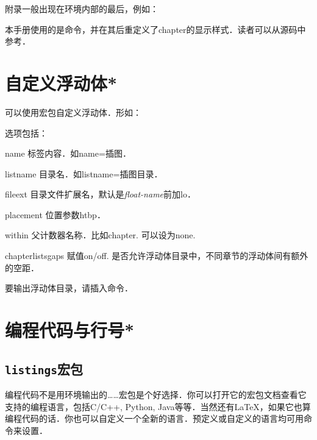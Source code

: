 附录一般出现在环境内部的最后，例如：
\begin{latex}
\end{latex}

本手册使用的是命令，并在其后重定义了chapter的显示样式．读者可以从源码中参考．

\section{自定义浮动体*}
可以使用宏包自定义浮动体．形如：
\begin{latex}
\end{latex}

选项包括：
\begin{para}
\item[name] 标签内容．如name=插图．
\item[listname] 目录名．如listname=插图目录．
\item[fileext] 目录文件扩展名，默认是\textit{float-name}前加lo．
\item[placement] 位置参数htbp．
\item[within] 父计数器名称．比如chapter. 可以设为none.
\item[chapterlistsgaps] 赋值on/off. 是否允许浮动体目录中，不同章节的浮动体间有额外的空距．
\end{para}

要输出浮动体目录，请插入命令．

\section{编程代码与行号*}
\label{sec:coding}
\subsection{\texttt{listings}宏包}
编程代码不是用环境输出的……宏包是个好选择．你可以打开它的宏包文档查看它支持的编程语言，包括C/C++, Python, Java等等．当然还有\LaTeX，如果它也算编程代码的话．你也可以自定义一个全新的语言．预定义或自定义的语言均可用命令来设置．
\begin{latex}
\end{latex}

